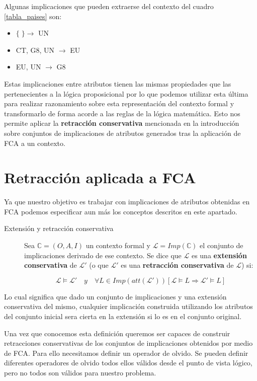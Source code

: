 	Algunas implicaciones que pueden extraerse del contexto del cuadro \ref{tabla_paises} son:
	
	\begin{itemize}
		\item $\{\;\} \rightarrow$ UN
		\item CT, G8, UN $\rightarrow$ EU
		\item EU, UN $\rightarrow$ G8 
	\end{itemize}

	Estas implicaciones entre atributos tienen las mismas propiedades que las pertenecientes a la lógica proposicional por lo que podemos utilizar esta última para realizar razonamiento sobre esta representación del contexto formal y transformarlo de forma acorde a las reglas de la lógica matemática. Esto nos permite aplicar la \textbf{retracción conservativa} mencionada en la introducción sobre conjuntos de implicaciones de atributos generados tras la aplicación de FCA a un contexto.
	
\section*{Retracción aplicada a FCA} 	

Ya que nuestro objetivo es trabajar con implicaciones de atributos obtenidas en FCA podemos especificar aun más los conceptos descritos en este apartado.

\begin{description}
	\item[Extensión y retracción conservativa] 
	Sea $\mathbb{C} = (O,A,I)$ un contexto formal y $\mathcal{L} = Imp(\mathbb{C})$ el conjunto de implicaciones derivado de ese contexto. Se dice que $\mathcal{L}$ es una \textbf{extensión conservativa} de $\mathcal{L}'$ (o que $\mathcal{L}'$ es una \textbf{retracción conservativa} de $\mathcal{L}$) si:
	
	\[ \mathcal{L} \models \mathcal{L}' \quad y \quad \forall L \in Imp(att(\mathcal{L}')) [\mathcal{L} \models L \Longrightarrow \mathcal{L}' \models L]  \]
\end{description}

Lo cual significa que dado un conjunto de implicaciones y una extensión conservativa del mismo, cualquier implicación construida utilizando los atributos del conjunto inicial sera cierta en la extensión si lo es en el conjunto original.

Una vez que conocemos esta definición queremos ser capaces de construir retracciones conservativas de los conjuntos de implicaciones obtenidos por medio de FCA. Para ello necesitamos definir un operador de olvido. Se pueden definir diferentes operadores de olvido todos ellos válidos desde el punto de vista lógico, pero no todos son válidos para nuestro problema.

